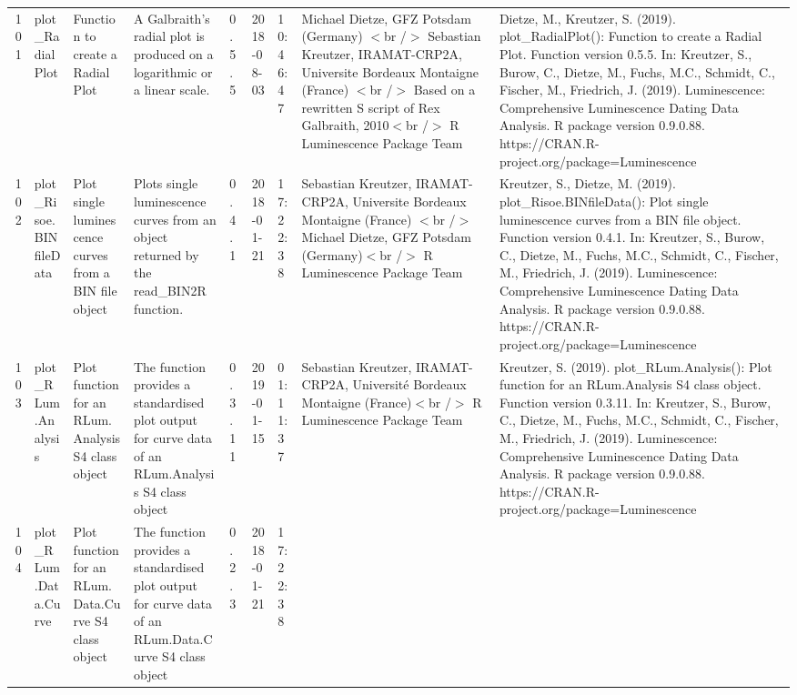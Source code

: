 \begin{table}[ht]
\begin{tabular}{rllllllll}
 \\ 
  101 & plot\_RadialPlot & Function to create a Radial Plot & A Galbraith's radial plot is produced on a logarithmic or a linear scale. & 0.5.5 & 2018-08-03 & 10:46:47
 & Michael Dietze, GFZ Potsdam (Germany) $<$br /$>$ Sebastian Kreutzer, IRAMAT-CRP2A, Universite Bordeaux Montaigne (France) $<$br /$>$ Based on a rewritten S script of Rex Galbraith, 2010$<$br /$>$  R Luminescence Package Team & Dietze, M., Kreutzer, S. (2019). plot\_RadialPlot(): Function to create a Radial Plot. Function version 0.5.5. In: Kreutzer, S., Burow, C., Dietze, M., Fuchs, M.C., Schmidt, C., Fischer, M., Friedrich, J. (2019). Luminescence: Comprehensive Luminescence Dating Data Analysis. R package version 0.9.0.88. https://CRAN.R-project.org/package=Luminescence
 \\ 
  102 & plot\_Risoe.BINfileData & Plot single luminescence curves from a BIN file object & Plots single luminescence curves from an object returned by the read\_BIN2R  function. & 0.4.1 & 2018-01-21 & 17:22:38
 & Sebastian Kreutzer, IRAMAT-CRP2A, Universite Bordeaux Montaigne (France) $<$br /$>$ Michael Dietze, GFZ Potsdam (Germany)$<$br /$>$  R Luminescence Package Team & Kreutzer, S., Dietze, M. (2019). plot\_Risoe.BINfileData(): Plot single luminescence curves from a BIN file object. Function version 0.4.1. In: Kreutzer, S., Burow, C., Dietze, M., Fuchs, M.C., Schmidt, C., Fischer, M., Friedrich, J. (2019). Luminescence: Comprehensive Luminescence Dating Data Analysis. R package version 0.9.0.88. https://CRAN.R-project.org/package=Luminescence
 \\ 
  103 & plot\_RLum.Analysis & Plot function for an RLum.Analysis S4 class object & The function provides a standardised plot output for curve data of an RLum.Analysis S4 class object & 0.3.11 & 2019-01-15 & 01:11:37
 & Sebastian Kreutzer, IRAMAT-CRP2A, Université Bordeaux Montaigne (France)$<$br /$>$  R Luminescence Package Team & Kreutzer, S. (2019). plot\_RLum.Analysis(): Plot function for an RLum.Analysis S4 class object. Function version 0.3.11. In: Kreutzer, S., Burow, C., Dietze, M., Fuchs, M.C., Schmidt, C., Fischer, M., Friedrich, J. (2019). Luminescence: Comprehensive Luminescence Dating Data Analysis. R package version 0.9.0.88. https://CRAN.R-project.org/package=Luminescence
 \\ 
  104 & plot\_RLum.Data.Curve & Plot function for an RLum.Data.Curve S4 class object & The function provides a standardised plot output for curve data of an RLum.Data.Curve S4 class object & 0.2.3 & 2018-01-21 & 17:22:38

\end{tabular}
\end{table}
